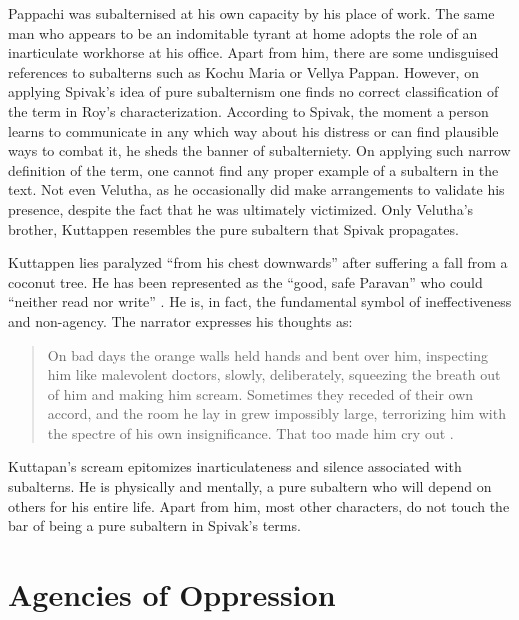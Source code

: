 Pappachi was subalternised at his own capacity by his place of work. The same man who appears to be an indomitable tyrant at home adopts the role of an inarticulate workhorse at his office. Apart from him, there are some undisguised references to subalterns such as Kochu Maria or Vellya Pappan. However, on applying Spivak's idea of pure subalternism one finds no correct classification of the term in Roy's characterization. According to Spivak, the moment a person learns to communicate in any which way about his distress or can find plausible ways to combat it, he sheds the banner of subalterniety. On applying such narrow definition of the term, one cannot find any proper example of a subaltern in the text. Not even Velutha, as he occasionally did make arrangements to validate his presence, despite the fact that he was ultimately victimized. Only Velutha's brother, Kuttappen resembles the pure subaltern that Spivak propagates. 

Kuttappen lies paralyzed ``from his chest downwards'' after suffering a fall from a coconut tree.  He has been represented as the ``good, safe Paravan'' who could ``neither read nor write'' \parencite[197]{Roy1997}. He is, in fact, the fundamental symbol of ineffectiveness and non-agency. The narrator expresses his thoughts as: 

\begin{quote}
  On bad days the orange walls held hands and bent over him, inspecting him like malevolent doctors, slowly, deliberately, squeezing the breath out of him and making him scream. Sometimes they receded of their own accord, and the room he lay in grew impossibly large, terrorizing him with the spectre of his own insignificance. That too made him cry out \parencite[197]{Roy1997}.
\end{quote}

Kuttapan's scream epitomizes inarticulateness and silence associated with subalterns. He is physically and mentally, a pure subaltern who will depend on others for his entire life. Apart from him, most other characters, do not touch the bar of being a pure subaltern in Spivak's terms. 

\section{Agencies of Oppression}

